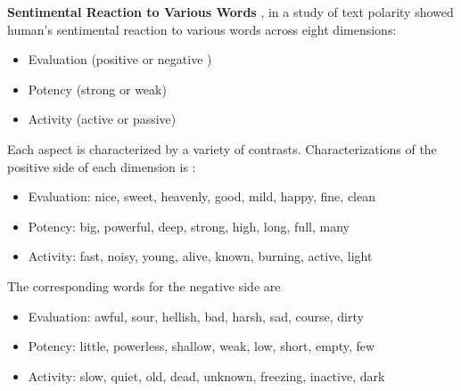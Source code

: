 \documentclass[11pt,a4paper]{article}
\begin{document}
\textbf{Sentimental Reaction to Various Words}
\citet{osgood}, in a study of text polarity showed human's sentimental reaction to various words across eight dimensions: 
\begin{itemize}
\item Evaluation (positive or negative )
\item Potency (strong or weak)
\item Activity (active or passive)
\end{itemize}
Each aspect is characterized by a variety of contrasts. Characterizations of the positive side of each dimension is \cite{heise}:
\begin{itemize}
\item Evaluation: nice, sweet, heavenly, good, mild, happy, fine, clean
\item Potency: big, powerful, deep, strong, high, long, full, many
\item Activity: fast, noisy, young, alive, known, burning, active, light
\end{itemize}
The corresponding words for the negative side are
\begin{itemize}
\item Evaluation: awful, sour, hellish, bad, harsh, sad, course, dirty
\item Potency: little, powerless, shallow, weak, low, short, empty, few
\item Activity: slow, quiet, old, dead, unknown, freezing, inactive, dark
\end{itemize}
\end{document}
